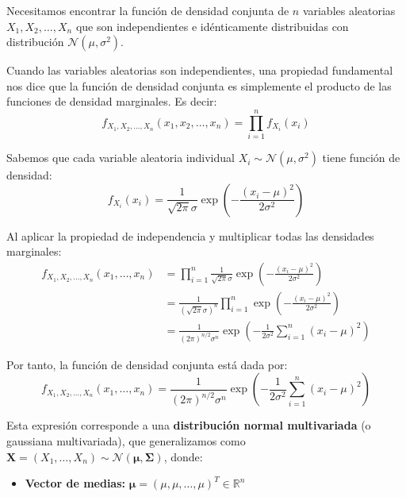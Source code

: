 \documentclass[
  11pt,
  letterpaper,
   addpoints,
  answers
  ]{exam}
\begin{document}
\begin{questions}
\begin{solution}
  Necesitamos encontrar la función de densidad conjunta de $n$ variables aleatorias $X_1, X_2, \ldots, X_n$ que son independientes e idénticamente distribuidas con distribución $\mathcal{N}(\mu, \sigma^2)$.
  
  Cuando las variables aleatorias son independientes, una propiedad fundamental nos dice que la función de densidad conjunta es simplemente el producto de las funciones de densidad marginales. Es decir:
  \begin{equation}
  f_{X_1,X_2,\ldots,X_n}(x_1, x_2, \ldots, x_n) = \prod_{i=1}^{n} f_{X_i}(x_i)
  \end{equation}
  
  Sabemos que cada variable aleatoria individual $X_i \sim \mathcal{N}(\mu, \sigma^2)$ tiene función de densidad:
  \begin{equation}
  f_{X_i}(x_i) = \frac{1}{\sqrt{2\pi} \sigma} \exp\left(-\frac{(x_i-\mu)^2}{2\sigma^2}\right)
  \end{equation}
  
  Al aplicar la propiedad de independencia y multiplicar todas las densidades marginales:
  \begin{align}
  f_{X_1,X_2,\ldots,X_n}(x_1, \ldots, x_n) &= \prod_{i=1}^{n} \frac{1}{\sqrt{2\pi} \sigma} \exp\left(-\frac{(x_i-\mu)^2}{2\sigma^2}\right)\\
  &= \frac{1}{(\sqrt{2\pi} \sigma)^n} \prod_{i=1}^{n} \exp\left(-\frac{(x_i-\mu)^2}{2\sigma^2}\right)\\
  &= \frac{1}{(2\pi)^{n/2} \sigma^n} \exp\left(-\frac{1}{2\sigma^2} \sum_{i=1}^{n} (x_i - \mu)^2\right)
  \end{align}
  
  Por tanto, la función de densidad conjunta está dada por:
  \begin{equation}
  f_{X_1,X_2,\ldots,X_n}(x_1, \ldots, x_n) = \frac{1}{(2\pi)^{n/2} \sigma^n} \exp\left(-\frac{1}{2\sigma^2} \sum_{i=1}^{n} (x_i - \mu)^2\right)
  \end{equation}
  

  
  Esta expresión corresponde a una \textbf{distribución normal multivariada} (o gaussiana multivariada), que generalizamos como $\mathbf{X} = (X_1, \ldots, X_n) \sim \mathcal{N}(\boldsymbol{\mu}, \boldsymbol{\Sigma})$, donde:
  
  \begin{itemize}
  \item \textbf{Vector de medias:} $\boldsymbol{\mu} = (\mu, \mu, \ldots, \mu)^T \in \mathbb{R}^n$
  

\end{itemize}
\end{solution}
\end{questions}
\end{document}
